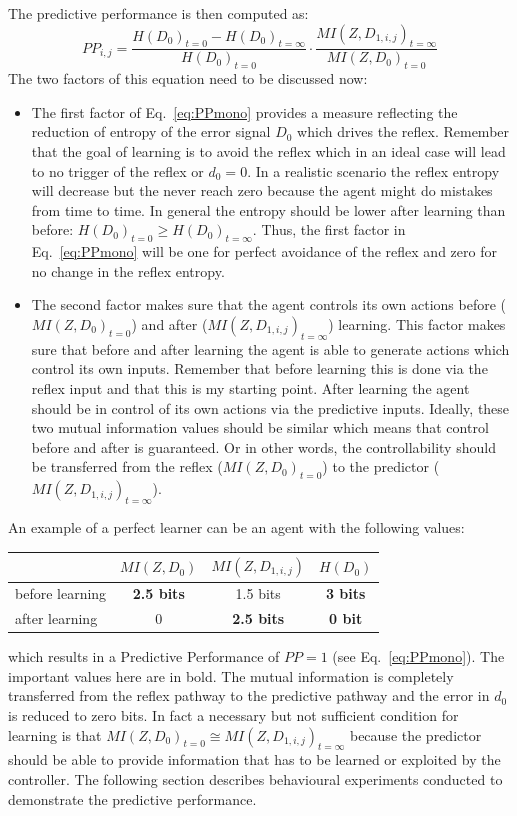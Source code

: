 The predictive performance is then computed as:
\begin{equation}
PP_{i,j}= \frac{H(D_0)_{t=0}-H(D_0)_{t=\infty}}{H(D_0)_{t=0}}\cdot 
\frac{MI(Z,D_{1,i,j})_{t=\infty}}{MI(Z,D_0)_{t=0}}
\label{eq:PPmono}
\end{equation}
The two factors of this equation need to be discussed now:
\begin{itemize}
\item The first factor of Eq.~\ref{eq:PPmono} provides a measure
  reflecting the reduction of entropy of the error signal $D_{0}$
  which drives the reflex. Remember that the goal of learning is to
  avoid the reflex which in an ideal case will lead to no trigger of
  the reflex or $d_0=0$. In a realistic scenario the reflex entropy
  will decrease but the never reach zero because the agent might do
  mistakes from time to time.  In general the entropy should be lower
  after learning than before: $H(D_0)_{t=0}\geq H(D_0)_{t=\infty}$.
  Thus, the first factor in Eq.~\ref{eq:PPmono} will be one for
  perfect avoidance of the reflex and zero for no change in the reflex
  entropy.
\item The second factor makes sure that the agent controls its own
  actions before ($MI(Z,D_0)_{t=0}$) and after
  ($MI(Z,D_{1,i,j})_{t=\infty}$) learning. This factor makes sure that
  before and after learning the agent is able to generate actions
  which control its own inputs. Remember that before learning this is
  done via the reflex input and that this is my starting point. After
  learning the agent should be in control of its own actions via the
  predictive inputs.  Ideally, these two mutual information values
  should be similar which means that control before and after is
  guaranteed. Or in other words, the controllability should be
  transferred from the reflex ($MI(Z,D_0)_{t=0}$) to the predictor
  ($MI(Z,D_{1,i,j})_{t=\infty}$).
\end{itemize}

An example of a perfect learner can be an agent with the following values:

\begin{center}
  \begin{tabular}{| l | c | c | c |}
    \hline
		& $MI(Z,D_0)$ & $MI(Z,D_{1,i,j})$ & $H(D_{0})$\\ \hline
    before learning & \textbf{2.5 bits} & 1.5 bits & \textbf{3 bits} \\ \hline
    after learning & 0 & \textbf{2.5 bits } & \textbf{0 bit}\\ \hline
  \end{tabular}
\end{center}
which results in a Predictive Performance of $PP=1$ (see Eq.~\ref{eq:PPmono}).
The important values here are in bold. The mutual information is completely transferred
from the reflex pathway to the predictive pathway and the error in $d_0$ is reduced 
to zero bits. In fact a necessary but not sufficient condition for learning is that 
$MI(Z,D_0)_{t=0} \cong MI(Z,D_{1,i,j})_{t=\infty}$ because the predictor should be able to
provide information that has to be learned or exploited by the controller.
The following section describes behavioural experiments conducted to demonstrate 
the predictive performance.

